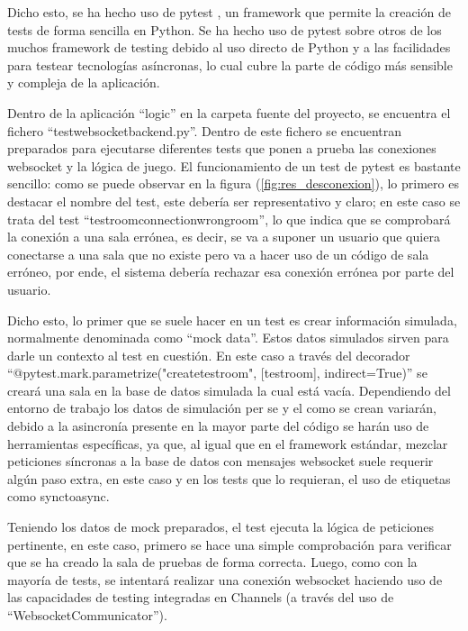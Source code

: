 Dicho esto, se ha hecho uso de pytest \cite{pytest}, un framework que permite la creación de tests de forma sencilla en Python. Se ha hecho uso
de pytest sobre otros de los muchos framework de testing debido al uso directo de Python y a las facilidades para testear 
tecnologías asíncronas, lo cual cubre la parte de código más sensible y compleja de la aplicación.

Dentro de la aplicación ``logic'' en la carpeta fuente del proyecto, se encuentra el fichero ``test\textunderscore websocket\textunderscore backend.py''. Dentro de este fichero
se encuentran preparados para ejecutarse diferentes tests que ponen a prueba las conexiones websocket y la lógica de juego. El funcionamiento de un test 
de pytest es bastante sencillo: como se puede observar en la figura (\ref{fig:res_desconexion}), lo primero es destacar el nombre del test, este debería ser representativo y 
claro; en este caso se trata del test ``test\textunderscore room\textunderscore connection\textunderscore wrong\textunderscore room'', lo que indica que 
se comprobará la conexión a una sala errónea, es decir, se va a suponer un usuario que quiera conectarse a una sala que no existe pero va a hacer uso
de un código de sala erróneo, por ende, el sistema debería rechazar esa conexión errónea por parte del usuario.

Dicho esto, lo primer que se suele hacer en un test es crear información simulada, normalmente denominada como ``mock data''. Estos datos simulados
sirven para darle un contexto al test en cuestión. En este caso a través del decorador ``@pytest.mark.parametrize("create\textunderscore test\textunderscore room", [test\textunderscore room], indirect=True)''
se creará una sala en la base de datos simulada la cual está vacía. Dependiendo del entorno de trabajo los datos de simulación per se y el como
se crean variarán, debido a la asincronía presente en la mayor parte del código se harán uso de herramientas específicas, ya que, al igual que 
en el framework estándar, mezclar peticiones síncronas a la base de datos con mensajes websocket suele requerir algún paso extra, en este caso y en los 
tests que lo requieran, el uso de etiquetas como sync\textunderscore to\textunderscore async.

Teniendo los datos de mock preparados, el test ejecuta la lógica de peticiones pertinente, en este caso, primero se hace
una simple comprobación para verificar que se ha creado la sala de pruebas de forma correcta. Luego, como con la mayoría de tests,
se intentará realizar una conexión websocket haciendo uso de las capacidades de testing integradas en Channels (a través del uso de ``WebsocketCommunicator'').

